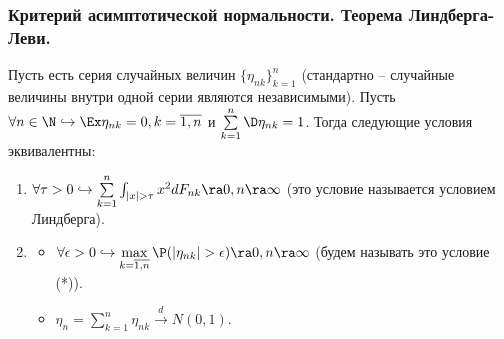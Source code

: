 \subsubsection{Критерий асимптотической нормальности. Теорема Линдберга-Леви.}
\begin{theorem}
    Пусть есть серия случайных величин $\{\eta_{nk}\}_{k = 1}^n$ (стандартно -- случайные величины внутри одной серии являются независимыми).
    Пусть $ \forall n \in \N \hookrightarrow \Ex \eta_{nk} = 0, k = \overline{1, n}$ и $\sum\limits_{k = 1}^{n} \D \eta_{nk} = 1$.
    Тогда следующие условия эквивалентны:
    \begin{enumerate}
        \item $\forall \tau > 0 \hookrightarrow \sum\limits_{k = 1}^{n} \int_{|x| > \tau} x^2 dF_{nk} \ra 0, n \ra \infty$ (это условие называется условием Линдберга).
        \item \begin{itemize}
                  \item $\forall \epsilon > 0 \hookrightarrow \max\limits_{k = \overline{1, n}} \P(|\eta_{nk}| > \epsilon) \ra 0, n \ra \infty$ (будем называть это условие (*)).
                  \item $\eta_n = \sum\limits_{k = 1}^{n} \eta_{nk} \xrightarrow{d} N(0, 1)$.
        \end{itemize}
    \end{enumerate}
\end{theorem}
